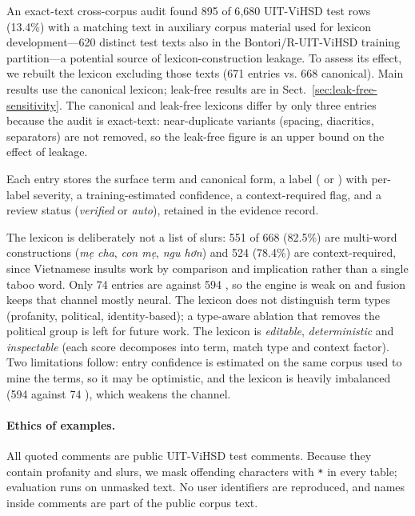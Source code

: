 An exact-text cross-corpus audit found 895 of 6{,}680 UIT-ViHSD test rows (13.4\%)
with a matching text in auxiliary corpus material used for lexicon development---620
distinct test texts also in the Bontori/R-UIT-ViHSD training partition---a potential
source of lexicon-construction leakage. To assess its effect, we rebuilt the lexicon
excluding those texts (671 entries vs. 668 canonical). Main results use the canonical
lexicon; leak-free results are in Sect.~\ref{sec:leak-free-sensitivity}. The canonical
and leak-free lexicons differ by only three entries because the audit is exact-text:
near-duplicate variants (spacing, diacritics, separators) are not removed, so the
leak-free figure is an upper bound on the effect of leakage.

Each entry stores the surface term and canonical form, a label (\hate{} or \off{}) with
per-label severity, a training-estimated confidence, a context-required flag, and a
review status (\emph{verified} or \emph{auto}), retained in the evidence record.

The lexicon is deliberately not a list of slurs: 551 of 668 (82.5\%) are multi-word
constructions (\emph{mẹ cha}, \emph{con mẹ}, \emph{ngu hơn}) and 524 (78.4\%) are
context-required, since Vietnamese insults work by comparison and implication rather
than a single taboo word. Only 74 entries are \off{} against 594 \hate{}, so the engine
is weak on \off{} and fusion keeps that channel mostly neural. The lexicon does not
distinguish term types (profanity, political, identity-based); a type-aware ablation
that removes the political group is left for future work. The lexicon is
\emph{editable}, \emph{deterministic} and \emph{inspectable} (each score decomposes
into term, match type and context factor). Two limitations follow: entry confidence
is estimated on the same corpus used to mine the terms, so it may be optimistic, and
the lexicon is heavily imbalanced (594 \hate{} against 74 \off{}), which weakens the
\off{} channel.

\paragraph{Ethics of examples.}
All quoted comments are public UIT-ViHSD test comments. Because they contain profanity
and slurs, we mask offending characters with \texttt{*} in every table; evaluation
runs on unmasked text. No user identifiers are reproduced, and names inside comments
are part of the public corpus text.